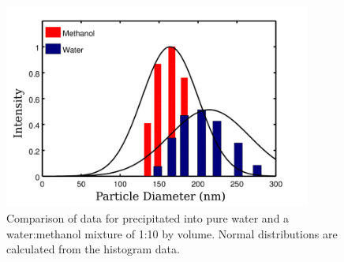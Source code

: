 \begin{figure}[h]
\centering
	\includegraphics[width=0.9\textwidth]{./figs/chap1/dlscompare}
	\caption{Comparison of \dls{} data for \nps{} precipitated into pure water and a water:methanol mixture of 1:10 by volume. Normal distributions are calculated from the histogram data.}
	\label{fig:dlsmeas}
\end{figure}
